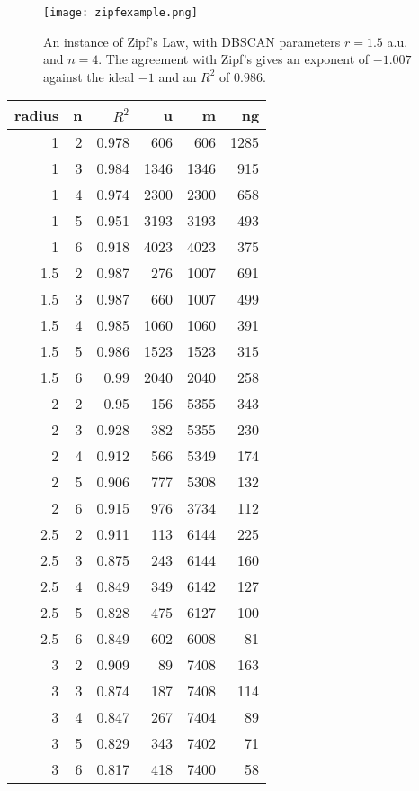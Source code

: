 \documentclass{article}
\begin{document}
\begin{figure}
  \centering
  \texttt{[image: zipfexample.png]}
  \caption{An instance of Zipf's Law, with DBSCAN parameters
    $r=1.5$ a.u. and $n=4$. The agreement with Zipf's
    gives an exponent of $-1.007$ against the ideal $-1$ and
    an $R^2$ of $0.986$.}
\end{figure}

\begin{tabular}{|r|r|r|r|r|r|}
 radius &  n  & $R^2$ & u & m & ng  \\ \hline
  1 &  2 &  0.978 & 606 & 606 & 1285 \\
  1 &  3 &  0.984 & 1346 & 1346 & 915 \\
  1 &  4 &  0.974 & 2300 & 2300 & 658 \\
  1 &  5 &  0.951 & 3193 & 3193 & 493 \\
  1 &  6 &  0.918 & 4023 & 4023 & 375 \\
  1.5 &  2 &  0.987 & 276 & 1007 & 691 \\
  1.5 &  3 &  0.987 & 660 & 1007 & 499 \\
  1.5 &  4 &  0.985 & 1060 & 1060 & 391 \\
  1.5 &  5 &  0.986 & 1523 & 1523 & 315 \\
  1.5 &  6 &  0.99 & 2040 & 2040 & 258 \\
  2 &  2 &  0.95 & 156 & 5355 & 343 \\
  2 &  3 &  0.928 & 382 & 5355 & 230 \\
  2 &  4 &  0.912 & 566 & 5349 & 174 \\
  2 &  5 &  0.906 & 777 & 5308 & 132 \\
  2 &  6 &  0.915 & 976 & 3734 & 112 \\
  2.5 &  2 &  0.911 & 113 & 6144 & 225 \\
  2.5 &  3 &  0.875 & 243 & 6144 & 160 \\
  2.5 &  4 &  0.849 & 349 & 6142 & 127 \\
  2.5 &  5 &  0.828 & 475 & 6127 & 100 \\
  2.5 &  6 &  0.849 & 602 & 6008 & 81 \\
  3 &  2 &  0.909 & 89 & 7408 & 163 \\
  3 &  3 &  0.874 & 187 & 7408 & 114 \\
  3 &  4 &  0.847 & 267 & 7404 & 89 \\
  3 &  5 &  0.829 & 343 & 7402 & 71 \\
  3 &  6 &  0.817 & 418 & 7400 & 58 
\end{tabular}
\end{document}
